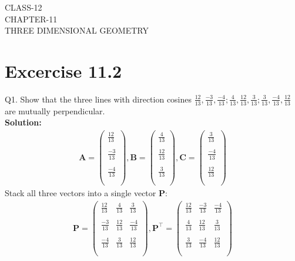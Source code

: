 \documentclass[12pt]{article}
\newcommand{\solution}{\noindent \textbf{Solution: }}
\newcommand{\myvec}[1]{\ensuremath{\begin{pmatrix}#1\end{pmatrix}}}
\let\vec\mathbf
\begin{document}
\begin{center}
\textbf\large{CLASS-12 \\ CHAPTER-11 \\ THREE DIMENSIONAL GEOMETRY}
\end{center}
\section*{Excercise 11.2}

Q1. Show that the three lines with direction cosines $\frac{12}{13}, \frac{-3}{13}, \frac{-4}{13}; \frac{4}{13}, \frac{12}{13}, \frac{3}{13}; \frac{3}{13}, \frac{-4}{13}, \frac{12}{13}$ are mutually perpendicular.
\\
\solution
		\begin{align}
		\vec{A}=\myvec{\frac{12}{13}\\\\\frac{-3}{13}\\\\\frac{-4}{13}\\\\},\vec{B}=\myvec{\frac{4}{13}\\\\\frac{12}{13}\\\\\frac{3}{13}\\\\},\vec{C}=\myvec{\frac{3}{13}\\\\\frac{-4}{13}\\\\\frac{12}{13}\\\\}
		\end{align}
			Stack all three vectors into a single vector $\vec{P}$:
			\begin{align}
	\vec{P}=\myvec{\frac{12}{13}&\frac{4}{13}    &\frac{3}{13}\\\\ \frac{-3}{13}&\frac{12}{13}&\frac{-4}{13}\\\\ \frac{-4}{13}&\frac{3}{13}&\frac{12}{13}\\\\}, \vec{P}^\top=\myvec{\frac{12}{13}&\frac{-3}{13}   &\frac{-4}{13}\\\\ \frac{4}{13}&\frac{12}{13}&\frac{3}{13}\\\\ \frac{3}{13}&\frac{-4}{13}&\frac{12}{13}\\\\}
		\end{align}
\end{document}
